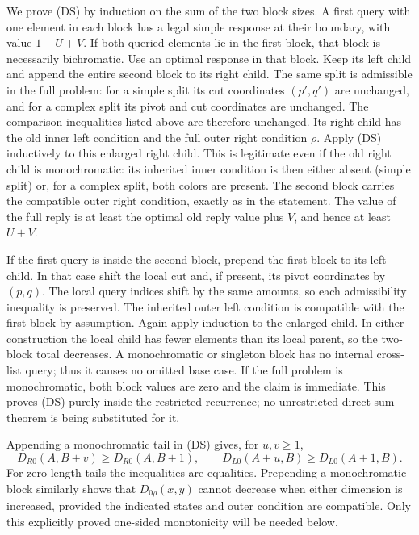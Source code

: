 \documentclass[11pt]{article}
\theoremstyle{definition}
\theoremstyle{remark}
\begin{document}
We prove (DS) by induction on the sum of the two block sizes. A first query
with one element in each block has a legal simple response at their boundary,
with value $1+U+V$. If both queried elements lie in the first block, that
block is necessarily bichromatic. Use an optimal response in that block.
Keep its left child and append the entire second block to its right child.
The same split is admissible in the full problem: for a simple split its
cut coordinates $(p',q')$ are unchanged, and for a complex split its pivot
and cut coordinates are unchanged. The comparison inequalities listed above
are therefore unchanged. Its right child has the old inner left condition
and the full outer right condition $\rho$. Apply (DS) inductively to this
enlarged right child. This is legitimate even if the old right child is
monochromatic: its inherited inner condition is then either absent (simple
split) or, for a complex split, both colors are present. The second block
carries the compatible outer right condition, exactly as in the statement.
The value of the full reply is at least the optimal old reply value plus
$V$, and hence at least $U+V$.

If the first query is inside the second block, prepend the first block to
its left child. In that case shift the local cut and, if present, its pivot
coordinates by $(p,q)$. The local query indices shift by the same amounts,
so each admissibility inequality is preserved. The inherited outer left
condition is compatible with the first block by assumption. Again apply
induction to the enlarged child. In either construction the local child
has fewer elements than its local parent, so the two-block total decreases.
A monochromatic or singleton block has no internal cross-list query; thus
it causes no omitted base case. If the full problem is monochromatic, both
block values are zero and the claim is immediate. This proves (DS) purely
inside the restricted recurrence; no unrestricted direct-sum theorem is
being substituted for it.

Appending a monochromatic tail in (DS) gives, for $u,v\ge1$,
\begin{equation}
 D_{R0}(A,B+v)\ge D_{R0}(A,B+1),\qquad
 D_{L0}(A+u,B)\ge D_{L0}(A+1,B).
 \tag{AX}
\end{equation}
For zero-length tails the inequalities are equalities. Prepending a
monochromatic block similarly shows that $D_{0\rho}(x,y)$ cannot decrease
when either dimension is increased, provided the indicated states and
outer condition are compatible. Only this explicitly proved one-sided
monotonicity will be needed below.
\end{document}
